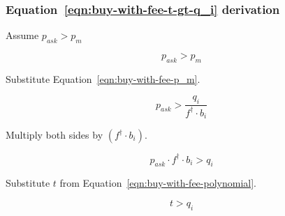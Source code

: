 \subsubsection{Equation~\ref{eqn:buy-with-fee-t-gt-q_i} derivation}%
\label{sssec:equation-eqn-buy-with-fee-t-gt-q-i-derivation}

Assume $p_{ask} > p_m$

\begin{equation*}
	p_{ask} > p_m
\end{equation*}

Substitute Equation~\ref{eqn:buy-with-fee-p_m}.

\begin{equation*}
	p_{ask} > \frac{q_i}{f^{\dagger} \cdot b_i}
\end{equation*}

Multiply both sides by $(f^{\dagger} \cdot b_i)$.

\begin{equation*}
	p_{ask} \cdot f^{\dagger} \cdot b_i > q_i
\end{equation*}

Substitute $t$ from Equation~\ref{eqn:buy-with-fee-polynomial}.

\begin{equation*}
	t > q_i
\end{equation*}
